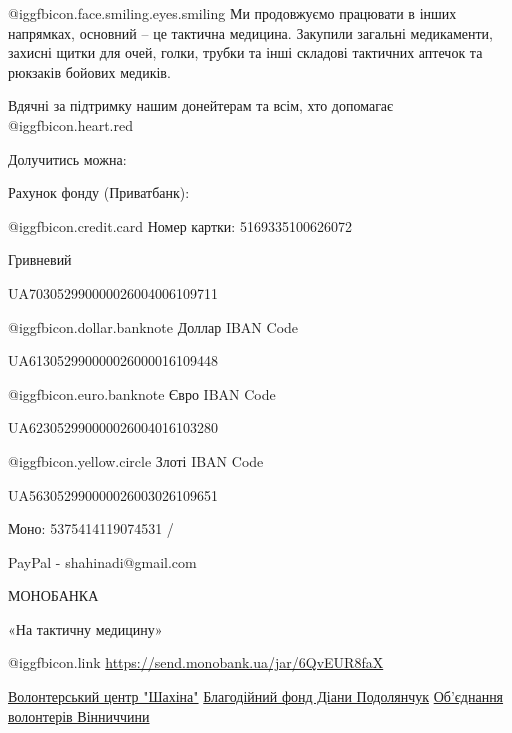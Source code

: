 @igg{fbicon.face.smiling.eyes.smiling} Ми продовжуємо працювати в інших
напрямках, основний – це тактична медицина.  Закупили загальні медикаменти,
захисні щитки для очей, голки, трубки та інші складові тактичних аптечок та
рюкзаків бойових медиків. 

Вдячні за підтримку нашим донейтерам та всім, хто допомагає @igg{fbicon.heart.red}

Долучитись можна:

Рахунок фонду (Приватбанк):\par
 @igg{fbicon.credit.card} Номер картки: 5169335100626072\par
Гривневий\par
UA703052990000026004006109711\par
 @igg{fbicon.dollar.banknote} Доллар IBAN Code\par
UA613052990000026000016109448\par
 @igg{fbicon.euro.banknote} Євро IBAN Code\par
UA623052990000026004016103280\par
 @igg{fbicon.yellow.circle} Злоті IBAN Code\par
UA563052990000026003026109651\par
Моно: 5375414119074531 /\par
PayPal - shahinadi@gmail.com\par
МОНОБАНКА \par
«На тактичну медицину» \par
 @igg{fbicon.link}  \url{https://send.monobank.ua/jar/6QvEUR8faX }\par

\obeycr
\href{https://www.facebook.com/profile.php?id=100081304876181}{Волонтерський центр "Шахіна"}
\href{https://www.facebook.com/shahinadi111}{Благодійний фонд Діани Подолянчук}
\href{https://www.facebook.com/groups/884456588253468/}{Об'єднання волонтерів Вінниччини}
\restorecr



